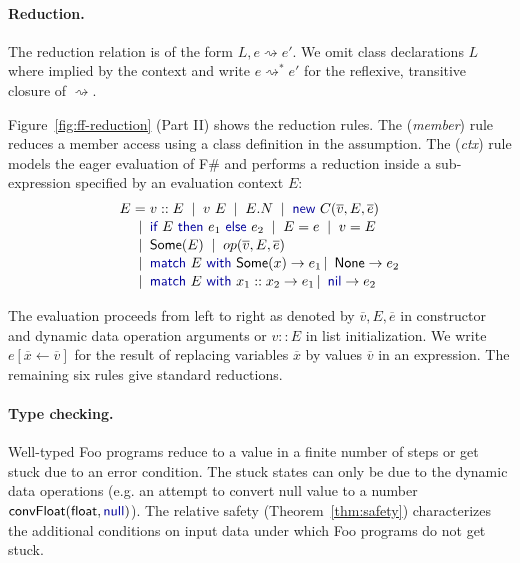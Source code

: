 \documentclass[10pt,nocopyrightspace]{sigplanconf}
\newcommand{\kvd}[1]{\textnormal{\textcolor{kvdclr}{\sffamily #1}}}
\newcommand{\ident}[1]{\textnormal{\sffamily #1}}
\newcommand{\lsep}[0]{\;\; | \;\;}
\newcommand{\narrow}[1]{\hspace{-0.7em} #1 \hspace{-0.7em}}
\newcommand{\reduce}{\rightsquigarrow}
\begin{document}

\paragraph{Reduction.}
The reduction relation is of the form $L, e \reduce e'$. We omit class declarations
$L$ where implied by the context and write $e \reduce^{*} e'$ for
the reflexive, transitive closure of $\reduce$.

Figure~\ref{fig:ff-reduction} (Part II) shows the reduction rules.  The (\emph{member}) rule reduces
a member access using a class definition in the assumption. The (\emph{ctx}) rule models the eager
evaluation of F\# and performs a reduction inside a sub-expression specified by an evaluation
context $E$:
%
\begin{equation*}
\begin{array}{rcl}
 E &\narrow{=}& v::E \lsep v~E \lsep E.N \lsep \kvd{new}~C(\overline{v}, E, \overline{e})\\[0.1em]
   &\narrow{|}&  \kvd{if}~E~\kvd{then}~e_1~\kvd{else}~e_2  \lsep E = e \lsep v = E \\[0.1em]
   &\narrow{|}& \ident{Some}(E) \lsep op(\overline{v}, E, \overline{e})\\[0.1em]
   &\narrow{|}& \kvd{match}~E~\kvd{with}~\ident{Some}(x) \rightarrow e_1 \,|\, \ident{None} \rightarrow e_2 \\[0.1em]
   &\narrow{|}& \kvd{match}~E~\kvd{with}~x_1 :: x_2 \rightarrow e_1 \,|\, \kvd{nil} \rightarrow e_2
\end{array}
\end{equation*}

\noindent
The evaluation proceeds from left to right as denoted by $\overline{v}, E, \overline{e}$ in
constructor and dynamic data operation arguments or $v::E$ in list initialization.
We write $e[\overline{x} \leftarrow \overline{v}]$ for the result of replacing variables $\overline{x}$ by
values $\overline{v}$ in an expression. The remaining six rules
give standard reductions.


\paragraph{Type checking.}
Well-typed Foo programs reduce to a value in a finite number of steps or get stuck due to an
error condition. The stuck states can only be due to the dynamic data operations (e.g. an attempt
to convert \kvd{null} value to a number $\ident{convFloat}(\ident{float},\kvd{null})$). The relative safety (Theorem~\ref{thm:safety})
characterizes the additional conditions on input data under which Foo programs do not get stuck.
\end{document}
